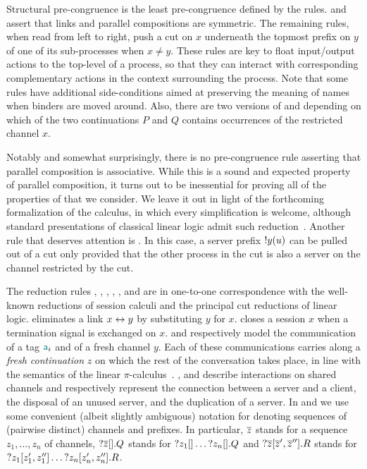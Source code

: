 Structural pre-congruence is the least pre-congruence defined by the
 rules.
%
\SLink and \SComm assert that links and parallel compositions are symmetric. The
remaining rules, when read from left to right, push a cut on $x$ underneath the
topmost prefix on $y$ of one of its sub-processes when $x \ne y$. These rules
are key to float input/output actions to the top-level of a process, so that
they can interact with corresponding complementary actions in the context
surrounding the process.
%
Note that some rules have additional side-conditions aimed at preserving the
meaning of names when binders are moved around. Also, there are two versions of
\SForkL and \SForkR depending on which of the two continuations $P$ and $Q$
contains occurrences of the restricted channel $x$.

Notably and somewhat surprisingly, there is no pre-congruence rule asserting
that parallel composition is associative. While this is a sound and expected
property of parallel composition, it turns out to be inessential for proving all
of the properties of \Calculus that we consider. We leave it out in light of the
forthcoming formalization of the calculus, in which every simplification is
welcome, although standard presentations of classical linear logic admit such
reduction~\cite{Doumane17}.
%
Another rule that deserves attention is \SServer. In this case, a server prefix
${!}y(u)$ can be pulled out of a cut only provided that the other process in
the cut is also a server on the channel restricted by the cut.

The reduction rules \RLink, \RClose, \RSelect, \RFork, \RConnect, \RWeaken and
\RContract are in one-to-one correspondence with the well-known reductions of
session calculi and the principal cut reductions of linear logic. \RLink
eliminates a link $x\leftrightarrow y$ by substituting $y$ for $x$. \RClose closes a
session $x$ when a termination signal is exchanged on $x$. \RSelect and \RFork
respectively model the communication of a tag $\mathsf{\color{teal}a}_i$ and of a fresh channel
$y$. Each of these communications carries along a \emph{fresh continuation} $z$
on which the rest of the conversation takes place, in line with the semantics of
the linear $\pi$-calculus~\cite{KobayashiPierceTurner99}.
%
\RConnect, \RWeaken and \RContract describe interactions on shared channels and
respectively represent the connection between a server and a client, the
disposal of an unused server, and the duplication of a server. In \RWeaken and
\RContract we use some convenient (albeit slightly ambiguous) notation for
denoting sequences of (pairwise distinct) channels and prefixes. In particular,
$\overline{z}$ stands for a sequence $z_1, \dots, z_n$ of channels,
${?}\overline{z}[].Q$ stands for ${?}z_1[]\dots{?}z_n[].Q$ and
${?}\overline{z}[\overline{z}',\overline{z}''].R$ stands for
${?}z_1[z_1',z_1'']\dots{?}z_n[z_n',z_n''].R$.

